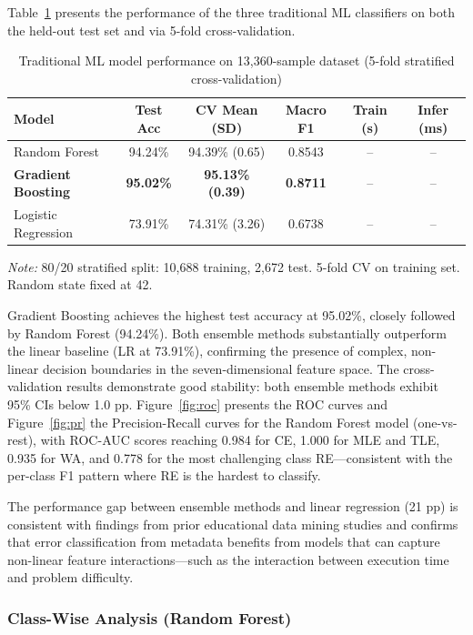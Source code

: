 \documentclass[10pt,letterpaper]{article}
\begin{document}
Table~\ref{tab:ml-results} presents the performance of the three traditional
ML classifiers on both the held-out test set and via 5-fold cross-validation.

\begin{table}[htbp]
\centering
\caption{Traditional ML model performance on 13,360-sample dataset (5-fold stratified cross-validation)}
\label{tab:ml-results}
\begin{tabular}{@{}lccccc@{}}
\toprule
Model & Test Acc & CV Mean (\textpm{}SD) & Macro F1 & Train (s) & Infer (ms) \\
\midrule
Random Forest       & 94.24\% & 94.39\% (\textpm{}0.65) & 0.8543 & -- & -- \\
\textbf{Gradient Boosting}   & \textbf{95.02\%} & \textbf{95.13\% (\textpm{}0.39)} & \textbf{0.8711} & -- & -- \\
Logistic Regression & 73.91\% & 74.31\% (\textpm{}3.26) & 0.6738 & -- & -- \\
\bottomrule
\end{tabular}
\end{table}

{\small \textit{Note:} 80/20 stratified split: 10,688 training, 2,672 test. 5-fold CV on training set. Random state fixed at 42.}

Gradient Boosting achieves the highest test accuracy at 95.02\%, closely followed by
Random Forest (94.24\%). Both ensemble methods substantially outperform
the linear baseline (LR at 73.91\%), confirming the presence of complex,
non-linear decision boundaries in the seven-dimensional feature space. The cross-validation
results demonstrate good stability: both ensemble methods exhibit 95\% CIs below
\textpm{}1.0 pp.
Figure~\ref{fig:roc} presents the ROC curves and Figure~\ref{fig:pr} the
Precision-Recall curves for the Random Forest model (one-vs-rest), with
ROC-AUC scores reaching 0.984 for CE, 1.000 for MLE and TLE, 0.935 for WA,
and 0.778 for the most challenging class RE---consistent with the per-class F1
pattern where RE is the hardest to classify.

The performance gap between ensemble methods and linear regression (21
pp) is consistent with findings from prior educational data mining studies
and confirms that error
classification from metadata benefits from models that can capture non-linear
feature interactions---such as the interaction between execution time and
problem difficulty.

\subsubsection*{Class-Wise Analysis (Random Forest)}
\end{document}
